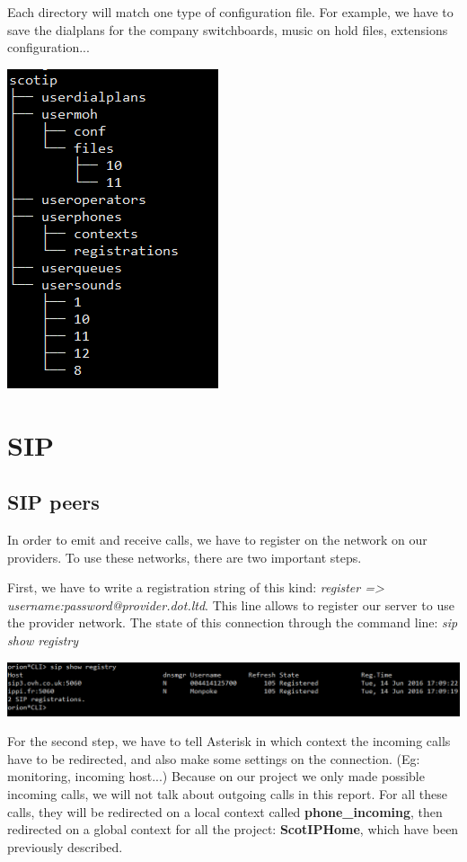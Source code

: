 Each directory will match one type of configuration file. For example, we have to save the dialplans for the company switchboards, music on hold files, extensions configuration... 

\includegraphics[scale=1]{img/files_struct_conf.png}

\section{SIP}

\subsection{SIP peers}
In order to emit and receive calls, we have to register on the network on our providers. To use these networks, there are two important steps. 


First, we have to write a registration string of this kind: \textit{register => username:password@provider.dot.ltd}. This line allows to register our server to use the provider network. The state of this connection through the command line: \textit{sip show registry}

\includegraphics[width=1\textwidth]{img/sipshowregistry.png}


For the second step, we have to tell Asterisk in which context the incoming calls have to be redirected, and also make some settings on the connection. (Eg: monitoring, incoming host...)
Because on our project we only made possible incoming calls, we will not talk about outgoing calls in this report. For all these calls, they will be redirected on a local context called \textbf{phone\_incoming}, then redirected on a global context for all the project: \textbf{ScotIPHome}, which have been previously described.


